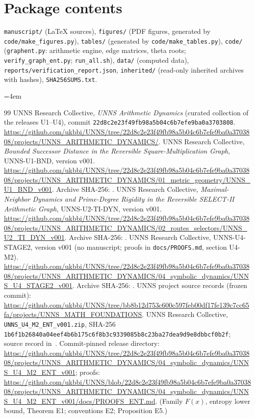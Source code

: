 \section{Package contents}
\texttt{manuscript/} (LaTeX sources), \texttt{figures/} (PDF figures, generated by \texttt{code/make\_figures.py}), \texttt{tables/} (generated by \texttt{code/make\_tables.py}), \texttt{code/} (\texttt{graphent.py}: arithmetic engine, edge matrices, theta roots; \texttt{verify\_graph\_ent.py}; \texttt{run\_all.sh}), \texttt{data/} (computed data), \texttt{reports/verification\_report.json}, \texttt{inherited/} (read-only inherited archives with hashes), \texttt{SHA256SUMS.txt}.

\begingroup\emergencystretch=4em
\begin{thebibliography}{99}\small
{} UNNS Research Collective, \emph{UNNS Arithmetic Dynamics} (curated collection of the releases U1--U4), commit \texttt{22d8c2e23f49fb98a5b04c6b7efe9ba0a3703808}. \url{https://github.com/ukbbi/UNNS/tree/22d8c2e23f49fb98a5b04c6b7efe9ba0a3703808/projects/UNNS_ARITHMETIC_DYNAMICS/}.
 UNNS Research Collective, \emph{Bounded Successor Distance in the Reversible Square-Multiplication Graph}, UNNS-U1-BND, version v001. \url{https://github.com/ukbbi/UNNS/tree/22d8c2e23f49fb98a5b04c6b7efe9ba0a3703808/projects/UNNS_ARITHMETIC_DYNAMICS/01_metric_geometry/UNNS_U1_BND_v001}. Archive SHA-256: .
 UNNS Research Collective, \emph{Maximal-Neighbor Dynamics and Prime-Degree Rigidity in the Reversible SELECT-II Arithmetic Graph}, UNNS-U2-TI-DYN, version v001. \url{https://github.com/ukbbi/UNNS/tree/22d8c2e23f49fb98a5b04c6b7efe9ba0a3703808/projects/UNNS_ARITHMETIC_DYNAMICS/02_routes_selectors/UNNS_U2_TI_DYN_v001}. Archive SHA-256: .
 UNNS Research Collective, UNNS-U4-STAGE2, version v001 (no manuscript; proofs in \texttt{docs/PROOFS.md}, section U4-M2). \url{https://github.com/ukbbi/UNNS/tree/22d8c2e23f49fb98a5b04c6b7efe9ba0a3703808/projects/UNNS_ARITHMETIC_DYNAMICS/04_symbolic_dynamics/UNNS_U4_STAGE2_v001}. Archive SHA-256: .
 UNNS project source records (frozen commit): \url{https://github.com/ukbbi/UNNS/tree/bb8b12d753c600c597feb00df17fe139c7cc65fa/projects/UNNS_MATH_FOUNDATIONS}.
 UNNS Research Collective, \texttt{UNNS\_U4\_M2\_ENT\_v001.zip}, SHA-256 \texttt{1b6f1b26840a04eef4b6b175c6f8b3c9339085b8c23ba27dea9d9e8dbbcf0b2f}; source record in~\cite{UNNS}. Commit-pinned release directory: \url{https://github.com/ukbbi/UNNS/tree/22d8c2e23f49fb98a5b04c6b7efe9ba0a3703808/projects/UNNS_ARITHMETIC_DYNAMICS/04_symbolic_dynamics/UNNS_U4_M2_ENT_v001}; proofs: \url{https://github.com/ukbbi/UNNS/blob/22d8c2e23f49fb98a5b04c6b7efe9ba0a3703808/projects/UNNS_ARITHMETIC_DYNAMICS/04_symbolic_dynamics/UNNS_U4_M2_ENT_v001/docs/PROOFS_ENT.md}. (Family $F(x)$, entropy lower bound, Theorem E1; conventions E2; Proposition E5.)

\end{thebibliography}
